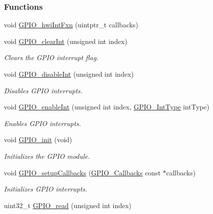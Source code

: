 \subsubsection*{Functions}
\begin{DoxyCompactItemize}
\item 
void \hyperlink{_g_p_i_o_8h_a987466bc80d2f5133a05795ad69a1d5f}{G\-P\-I\-O\-\_\-hwi\-Int\-Fxn} (uintptr\-\_\-t callbacks)
\item 
void \hyperlink{_g_p_i_o_8h_ad890aa2518ec2f4c88419dc4036b6197}{G\-P\-I\-O\-\_\-clear\-Int} (unsigned int index)
\begin{DoxyCompactList}\small\item\em Clears the G\-P\-I\-O interrupt flag. \end{DoxyCompactList}\item 
void \hyperlink{_g_p_i_o_8h_a37f548f4dabd9ee12e3ba4805ce1680e}{G\-P\-I\-O\-\_\-disable\-Int} (unsigned int index)
\begin{DoxyCompactList}\small\item\em Disables G\-P\-I\-O interrupts. \end{DoxyCompactList}\item 
void \hyperlink{_g_p_i_o_8h_afbda626cf60f986601cb9270f0dd9702}{G\-P\-I\-O\-\_\-enable\-Int} (unsigned int index, \hyperlink{_g_p_i_o_8h_abf424f4c82447febc105783bb24d66b0}{G\-P\-I\-O\-\_\-\-Int\-Type} int\-Type)
\begin{DoxyCompactList}\small\item\em Enables G\-P\-I\-O interrupts. \end{DoxyCompactList}\item 
void \hyperlink{_g_p_i_o_8h_a75690af9e89afd801dc40b20b5c813f1}{G\-P\-I\-O\-\_\-init} (void)
\begin{DoxyCompactList}\small\item\em Initializes the G\-P\-I\-O module. \end{DoxyCompactList}\item 
void \hyperlink{_g_p_i_o_8h_af00c188a9e451094c5de1109141f30db}{G\-P\-I\-O\-\_\-setup\-Callbacks} (\hyperlink{struct_g_p_i_o___callbacks}{G\-P\-I\-O\-\_\-\-Callbacks} const $\ast$callbacks)
\begin{DoxyCompactList}\small\item\em Initializes G\-P\-I\-O interrupts. \end{DoxyCompactList}\item 
uint32\-\_\-t \hyperlink{_g_p_i_o_8h_a6facb3b05248e72f214e3f74ec9b25a6}{G\-P\-I\-O\-\_\-read} (unsigned int index)

\end{DoxyCompactItemize}
